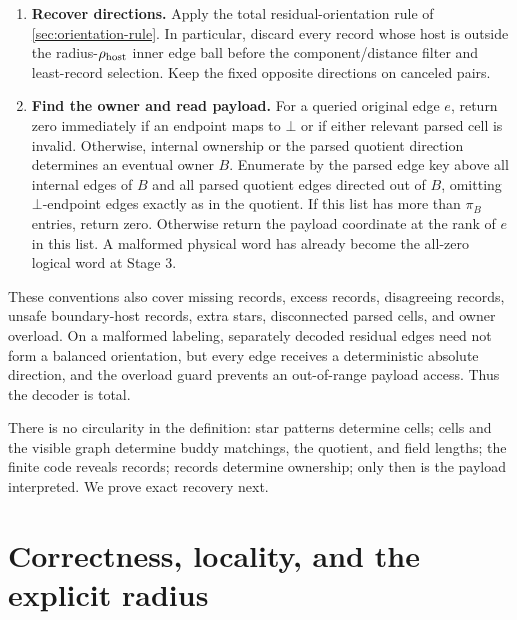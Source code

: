 \documentclass[11pt]{article}
\theoremstyle{definition}
\theoremstyle{remark}
\begin{document}
\begin{enumerate}[label=\textbf{\arabic*.},leftmargin=2.3em]
\item \textbf{Recover directions.}
      Apply the total residual-orientation rule of
      \cref{sec:orientation-rule}.  In particular, discard every record whose
      host is outside the radius-$\rho_{\rm host}$ inner edge ball before the
      component/distance filter and least-record selection.  Keep the fixed
      opposite directions on canceled pairs.

\item \textbf{Find the owner and read payload.}
      For a queried original edge $e$, return zero immediately if an endpoint
      maps to $\bot$ or if either relevant parsed cell is invalid.  Otherwise,
      internal ownership or the parsed quotient direction determines an
      eventual owner $B$.  Enumerate by the parsed edge key above all internal
      edges of $B$ and all parsed quotient edges directed out of $B$, omitting
      $\bot$-endpoint edges exactly as in the quotient.  If this list has more
      than $\pi_B$ entries, return zero.  Otherwise return the payload
      coordinate at the rank of $e$ in this list.  A malformed physical word
      has already become the all-zero logical word at Stage 3.
\end{enumerate}

These conventions also cover missing records, excess records, disagreeing
records, unsafe boundary-host records, extra stars, disconnected parsed
cells, and owner overload.  On a
malformed labeling, separately decoded residual edges need not form a
balanced orientation, but every edge receives a deterministic absolute
direction, and the overload guard prevents an out-of-range payload access.
Thus the decoder is total.

There is no circularity in the definition: star patterns determine cells;
cells and the visible graph determine buddy matchings, the quotient, and
field lengths; the finite code reveals records; records determine ownership;
only then is the payload interpreted.  We prove exact recovery next.

\section{Correctness, locality, and the explicit radius}
\label{sec:locality}
\end{document}
